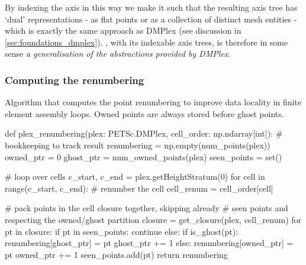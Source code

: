 \documentclass[thesis]{subfiles}
\begin{document}
By indexing the  axis in this way we make it such that the resulting axis tree has `dual' representations - as flat points or as a collection of distinct mesh entities - which is exactly the same approach as DMPlex (see discussion in \cref{sec:foundations_dmplex}).
, with its indexable axis trees, is therefore in some sense \emph{a generalisation of the abstractions provided by DMPlex}.

\subsubsection{Computing the renumbering}

\begin{algorithm}
  \caption{
    Algorithm that computes the point renumbering to improve data locality in finite element assembly loops.
    Owned points are always stored before ghost points.
  }

  \begin{center}
    \begin{minipage}{.9\textwidth}
      \begin{pyalg2}
        def plex_renumbering(plex: PETSc.DMPlex, cell_order: np.ndarray[int]):
          # bookkeeping to track result
          renumbering = np.empty(num_points(plex))
          owned_ptr = 0
          ghost_ptr = num_owned_points(plex)
          seen_points = set()

          # loop over cells
          c_start, c_end = plex.getHeightStratum(0)
          for cell in range(c_start, c_end):
            # renumber the cell
            cell_renum = cell_order[cell]

            # pack points in the cell closure together, skipping already
            # seen points and respecting the owned/ghost partition
            closure = get_closure(plex, cell_renum)
            for pt in closure:
              if pt in seen_points:
                continue
              else:
                if is_ghost(pt):
                  renumbering[ghost_ptr] = pt
                  ghost_ptr += 1
                else:
                  renumbering[owned_ptr] = pt
                  owned_ptr += 1
                seen_points.add(pt)
        return renumbering
      \end{pyalg2}
    \end{minipage}
  \end{center}
  \label{alg:plex_renumbering}
\end{algorithm}
\end{document}
